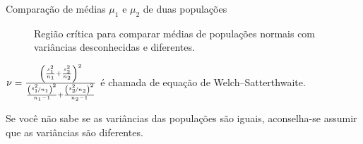 \documentclass[9pt]{beamer}
\begin{document}
\begin{frame}{Comparação de médias $\mu_1$ e $\mu_2$ de duas populações}
\begin{figure}[htbp]
	\centering
	 \hfill
	 \hfill
	\caption{Região crítica para comparar médias de populações normais com variâncias desconhecidas e diferentes.}
\end{figure}

$\nu = \frac{\left( \frac{s_1^2}{n_1} + \frac{s_2^2}{n_2} \right)^2}{ \frac{\left( \nicefrac{s_1^2}{n_1} \right)^2}{n_1-1} + \frac{\left( \nicefrac{s_2^2}{n_2} \right)^2}{n_2-1} }$ é chamada de equação de Welch–Satterthwaite.


\textcolor{important}{Se você não sabe se as variâncias das populações são iguais, aconselha-se assumir que as variâncias são diferentes.}
\end{frame}
\end{document}
